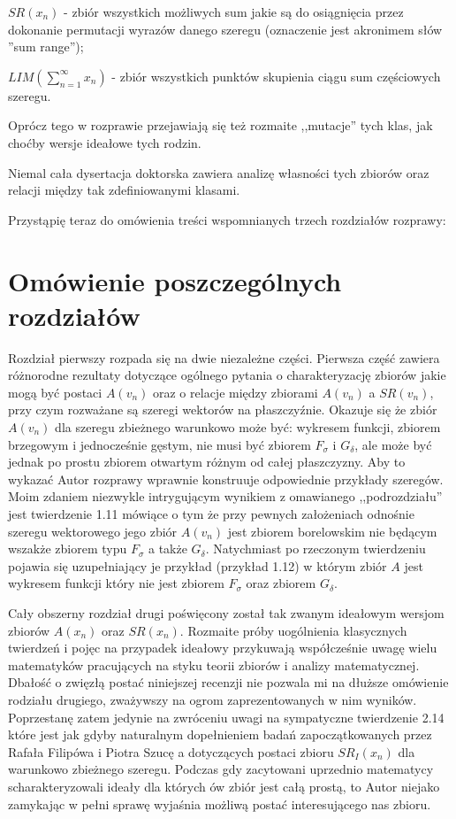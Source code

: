 \documentclass[12pt]{article}
\begin{document}
$SR(x_n)$ - zbiór wszystkich możliwych sum jakie są
do osiągnięcia przez dokonanie permutacji wyrazów
danego szeregu (oznaczenie jest akronimem słów 
''sum range'');

$LIM(\sum_{n=1}^\infty x_n)$ - zbiór wszystkich punktów
skupienia ciągu sum częściowych szeregu.

  Oprócz tego w rozprawie przejawiają się też rozmaite ,,mutacje''
tych klas, jak choćby wersje ideałowe tych rodzin.
  
  Niemal cała dysertacja doktorska zawiera analizę
własności tych zbiorów oraz relacji między tak zdefiniowanymi
klasami.
  

  Przystąpię teraz do omówienia treści wspomnianych trzech rozdziałów rozprawy:

\section{Omówienie poszczególnych rozdziałów}

Rozdział pierwszy rozpada się na dwie niezależne części.
Pierwsza część zawiera różnorodne rezultaty dotyczące ogólnego
pytania o charakteryzację zbiorów jakie mogą być postaci $A(v_n)$
oraz o relacje między zbiorami $A(v_n)$ a $SR(v_n)$, przy czym
rozważane są szeregi wektorów na płaszczyźnie.
Okazuje się że zbiór $A(v_n)$ dla szeregu zbieżnego warunkowo 
może być: wykresem funkcji,
zbiorem brzegowym i jednocześnie gęstym, nie musi być zbiorem
$F_\sigma$ i $G_\delta$, ale może być jednak po prostu zbiorem
otwartym różnym od całej płaszczyzny. Aby to wykazać Autor rozprawy 
wprawnie konstruuje odpowiednie przykłady szeregów. Moim zdaniem niezwykle
intrygującym wynikiem z omawianego ,,podrozdziału'' jest twierdzenie
1.11 mówiące o tym że przy pewnych założeniach odnośnie szeregu
wektorowego jego zbiór $A(v_n)$ jest zbiorem borelowskim 
nie będącym wszakże zbiorem typu $F_\sigma$ a także 
$G_\delta$. Natychmiast po rzeczonym twierdzeniu pojawia się uzupełniający
je przykład (przykład 1.12) w którym zbiór $A$ jest wykresem funkcji 
który nie jest zbiorem $F_\sigma$ oraz zbiorem $G_\delta$. 
    
  Cały obszerny rozdział drugi poświęcony został 
tak zwanym ideałowym wersjom zbiorów $A(x_n)$ oraz
$SR(x_n)$. Rozmaite próby uogólnienia klasycznych twierdzeń
i pojęc na przypadek ideałowy przykuwają współcześnie
uwagę wielu matematyków pracujących na styku teorii zbiorów 
i analizy matematycznej. Dbałość o zwięzłą postać niniejszej
recenzji nie pozwala mi na dłuższe omówienie rodziału drugiego,
zważywszy na ogrom zaprezentowanych w nim wyników. Poprzestanę zatem
jedynie na zwróceniu uwagi na sympatyczne twierdzenie 2.14 które 
jest jak gdyby naturalnym dopełnieniem badań zapoczątkowanych
przez Rafała Filipówa i Piotra Szucę a dotyczących 
postaci zbioru $SR_I(x_n)$ dla warunkowo zbieżnego szeregu.
Podczas gdy zacytowani uprzednio matematycy scharakteryzowali
ideały dla których ów zbiór jest całą prostą, to
Autor niejako zamykając w pełni sprawę wyjaśnia możliwą
postać interesującego nas zbioru.
  
\end{document}
